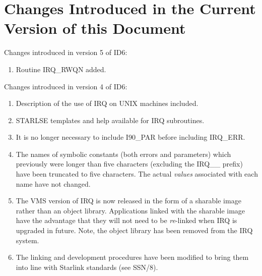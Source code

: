\section {Changes Introduced in the Current Version of this Document}
\label {SEC:CHANGES}

Changes introduced in version 5 of ID6:
\begin {enumerate}
\item Routine IRQ\_RWQN added.
\end {enumerate}

Changes introduced in version 4 of ID6:
\begin {enumerate}
\item Description of the use of IRQ on UNIX machines included.
\item STARLSE templates and help available for IRQ subroutines.
\item It is no longer necessary to include I90\_PAR before including
IRQ\_ERR.
\item The names of symbolic constants (both errors and parameters) which previously 
were longer than five characters (excluding the IRQ\_\_ prefix) have been
truncated to five characters. The actual {\em values} associated with each name 
have not changed.
\item The VMS version of IRQ is now released in the form of a sharable image 
rather than an object library. Applications linked with the sharable image have 
the advantage that they will not need to be {\em re}-linked when IRQ is upgraded 
in future. Note, the object library has been removed from the IRQ system.
\item The linking and development procedures have been modified to bring them 
into line with Starlink standards (see SSN/8).

\end {enumerate}


